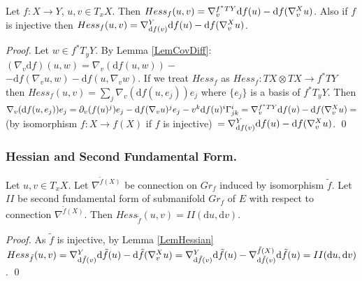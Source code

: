 \documentclass{llncs}
\newcommand{\partderiv}[2]{\partial_{#2} {#1}}
\newcommand{\CovariantDiffManif}[1]{\nabla^{#1}}
\newcommand{\CovariantDerivManif}[2]{\tensor*{\nabla}{^{#1}_{#2}}}
\newcommand{\CovariantDeriv}[1]{\nabla_{#1}}
\newcommand{\Diff}{\mathrm{d}}
\newcommand{\TangentSpaceArg}[2]{{T_{#2}}{#1}}
\newcommand{\TangentBundle}[1]{T{#1}}
\newcommand {\Preimage}[2]{{#2}^*{#1}}
\newcommand \TArgPreimage[3]{\Preimage{\TangentSpaceArg{#1}{#2}}{#3}}
\newcommand \TPreimage[2]{\Preimage{\TangentBundle{#1}}{#2}}
\begin{document}
\begin{lemma} \label{LemHessian}
Let $f:X\to Y$, $u, v\in T_x X$. Then
$Hess_f(u,v)=\CovariantDerivManif{\TPreimage{Y}{f}} {v} \Diff f(u) - 
							\Diff f( 
							\CovariantDerivManif{X}{v}u
							)$. Also if $f$ is injective then
$Hess_f(u,v)=\CovariantDerivManif{Y}{ \Diff f(v)} \Diff f(u) - 
							\Diff f( 
							\CovariantDerivManif{X}{v}u
							)$.
\end{lemma}

\begin{proof}
Let $w\in \TArgPreimage{Y}{y}{f}$. By Lemma \ref{LemCovDiff}: 
$(\CovariantDeriv{v} \Diff f)(u, w) = \CovariantDeriv{v}{(\Diff f(u, w))} -$
\\
$- \Diff f(\CovariantDeriv{v}{u}, w) - \Diff f({u}, \CovariantDeriv{v}{w})$.
If we treat $Hess_f$ as $Hess_f:\TangentBundle{X}\otimes\TangentBundle{X}\to \TPreimage{Y}{f}$ 
then $Hess_f(u, v)= \sum_{j} \CovariantDeriv{v}{(\Diff f(u, e_j))} e_j$ where $\{e_j\}$ is a basis of $\TArgPreimage{Y}{y}{f}$. Then
$\CovariantDeriv{v}{(\Diff f(u, e_j))} e_j = \partderiv{(f(u)^j)}{v} e_j - \Diff f(\CovariantDeriv{v}{u})^j e_j - v^k \Diff f(u)^i \tensor*{\Gamma}{^i_j_k}= 
\CovariantDerivManif{\TPreimage{Y}{f}} {v} \Diff f(u) - 
							\Diff f( 
							\CovariantDerivManif{X}{v}u
							) =$ 
							\\
							(by isomorphism $f:X\to f(X)$ if $f$ is injective)
							$\,=\CovariantDerivManif{Y} {\Diff f(v)} \Diff f(u) - 
							\Diff f( 
							\CovariantDerivManif{X}{v}u )$.
\qed 
\end{proof}

\subsubsection{Hessian and Second Fundamental Form.}

\begin{lemma}  \label{LemSecondFormHessian}
Let $u, v \in T_xX$. Let $\CovariantDiffManif{\tilde{f}(X)}$ be connection on $Gr_f$ induced by isomorphism $\tilde{f}$. Let $II$ be second fundamental form of submanifold $Gr_f$ of $E$ with respect to connection $\CovariantDiffManif{\tilde{f}(X)}$. Then $Hess_{\tilde{f}}(u, v) = II(\Diff u, \Diff v)$.
\end{lemma}

\begin{proof}
As $\tilde{f}$ is injective, by Lemma \ref{LemHessian} $Hess_{\tilde{f}}(u, v) = 
						\CovariantDerivManif{Y} {\Diff \tilde{f}(v)} \Diff \tilde{f}(u) - 
							\Diff \tilde{f}(\CovariantDerivManif{X}{v}u ) = \CovariantDerivManif{Y} {\Diff \tilde{f}(v)} \Diff \tilde{f}(u) - 
							\CovariantDerivManif{\tilde{f}(X)}{\Diff \tilde{f}(v)}\Diff \tilde{f}(u) = II(\Diff u, \Diff v)$.
\qed
\end{proof}
\end{document}

